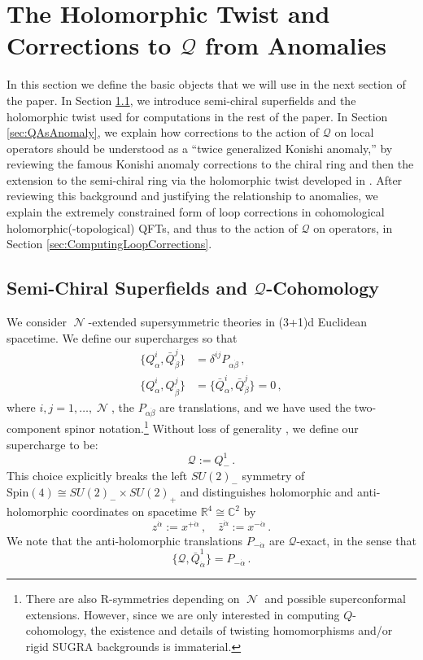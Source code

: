 \documentclass[11pt]{article}
\DeclareMathOperator{\calN}{\mathcal{N}}
\def\bbR{\mathbb{R}}
\def\bbC{\mathbb{C}}
\renewcommand{\bm}{\mathcal}
\begin{document}
\section{The Holomorphic Twist and Corrections to \texorpdfstring{$\bm{Q}$}{Q} from Anomalies}\label{sec:QuantumCorrections}
In this section we define the basic objects that we will use in the next section of the paper. In Section \ref{sec:SemiChiralOps}, we introduce semi-chiral superfields and the holomorphic twist used for computations in the rest of the paper. In Section \ref{sec:QAsAnomaly}, we explain how corrections to the action of $\bm{Q}$ on local operators should be understood as a ``twice generalized Konishi anomaly,'' by reviewing the famous Konishi anomaly corrections to the chiral ring \cite{CDSW} and then the extension to the semi-chiral ring via the holomorphic twist developed in \cite{Budzik:2022mpd, Budzik:2023xbr, Gaiotto:2024gii}. After reviewing this background and justifying the relationship to anomalies, we explain the extremely constrained form of loop corrections in cohomological holomorphic(-topological) QFTs, and thus to the action of $\bm{Q}$ on operators, in Section \ref{sec:ComputingLoopCorrections}.

\subsection{Semi-Chiral Superfields and \texorpdfstring{$\bm{Q}$}{Q}-Cohomology}\label{sec:SemiChiralOps}
We consider $\calN$-extended supersymmetric theories in (3+1)d Euclidean spacetime. We define our supercharges so that
\begin{align}
    \{Q^i_\alpha, \bar{Q}^j_{\dot\beta}\} 
        &= \delta^{ij}P_{\alpha\dot\beta}\,,\\
    \{Q^i_\alpha, Q^j_{\dot\beta}\} 
        &= \{\bar{Q}^i_\alpha, \bar{Q}^j_{\dot\beta}\} = 0\,,
\end{align}
where $i,j=1,\dots, \calN$, the $P_{\alpha\dot\beta}$ are translations, and we have used the two-component spinor notation.\footnote{There are also R-symmetries depending on $\calN$ and possible superconformal extensions. However, since we are only interested in computing $Q$-cohomology, the existence and details of twisting homomorphisms and/or rigid SUGRA backgrounds is immaterial.} Without loss of generality \cite{Eager:2018dsx, Elliott:2020ecf}, we define our supercharge to be:
\begin{equation}
    \bm{Q} := Q_{-}^{1}\,.
\end{equation}
This choice explicitly breaks the left $SU(2)_-$ symmetry of $\mathrm{Spin}(4) \cong SU(2)_- \times SU(2)_+$ and distinguishes holomorphic and anti-holomorphic coordinates on spacetime $\bbR^4 \cong \bbC^2$ by
\begin{equation}
    z^{\dot\alpha} := x^{+\dot\alpha}\,,\quad
    \bar{z}^{\dot\alpha} := x^{-\dot\alpha}\,.
\end{equation}
We note that the anti-holomorphic translations $P_{-\dot\alpha}$ are $\bm{Q}$-exact, in the sense that
\begin{equation}\label{eq:QHolomorphic}
    \{\bm{Q}, \bar{Q}_{\dot\alpha}^{1}\} = P_{-\dot{\alpha}}\,.
\end{equation}
\end{document}
